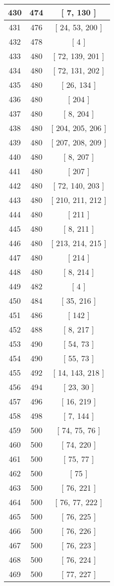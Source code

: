 \begin{center}
\begin{longtable}[H]{|| c c c ||}
\hline
430 & 474 & [ 7, 130 ] \\ 
\hline
431 & 476 & [ 24, 53, 200 ] \\ 
\hline
432 & 478 & [ 4 ] \\ 
\hline
433 & 480 & [ 72, 139, 201 ] \\ 
\hline
434 & 480 & [ 72, 131, 202 ] \\ 
\hline
435 & 480 & [ 26, 134 ] \\ 
\hline
436 & 480 & [ 204 ] \\ 
\hline
437 & 480 & [ 8, 204 ] \\ 
\hline
438 & 480 & [ 204, 205, 206 ] \\ 
\hline
439 & 480 & [ 207, 208, 209 ] \\ 
\hline
440 & 480 & [ 8, 207 ] \\ 
\hline
441 & 480 & [ 207 ] \\ 
\hline
442 & 480 & [ 72, 140, 203 ] \\ 
\hline
443 & 480 & [ 210, 211, 212 ] \\ 
\hline
444 & 480 & [ 211 ] \\ 
\hline
445 & 480 & [ 8, 211 ] \\ 
\hline
446 & 480 & [ 213, 214, 215 ] \\ 
\hline
447 & 480 & [ 214 ] \\ 
\hline
448 & 480 & [ 8, 214 ] \\ 
\hline
449 & 482 & [ 4 ] \\ 
\hline
450 & 484 & [ 35, 216 ] \\ 
\hline
451 & 486 & [ 142 ] \\ 
\hline
452 & 488 & [ 8, 217 ] \\ 
\hline
453 & 490 & [ 54, 73 ] \\ 
\hline
454 & 490 & [ 55, 73 ] \\ 
\hline
455 & 492 & [ 14, 143, 218 ] \\ 
\hline
456 & 494 & [ 23, 30 ] \\ 
\hline
457 & 496 & [ 16, 219 ] \\ 
\hline
458 & 498 & [ 7, 144 ] \\ 
\hline
459 & 500 & [ 74, 75, 76 ] \\ 
\hline
460 & 500 & [ 74, 220 ] \\ 
\hline
461 & 500 & [ 75, 77 ] \\ 
\hline
462 & 500 & [ 75 ] \\ 
\hline
463 & 500 & [ 76, 221 ] \\ 
\hline
464 & 500 & [ 76, 77, 222 ] \\ 
\hline
465 & 500 & [ 76, 225 ] \\ 
\hline
466 & 500 & [ 76, 226 ] \\ 
\hline
467 & 500 & [ 76, 223 ] \\ 
\hline
468 & 500 & [ 76, 224 ] \\ 
\hline
469 & 500 & [ 77, 227 ] \\ 
\hline
\end{longtable}
\end{center}
